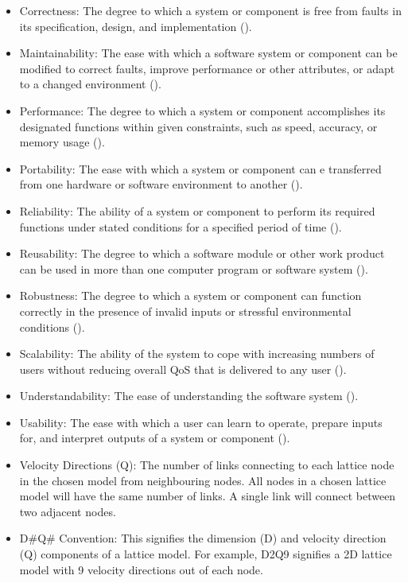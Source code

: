 \documentclass[12pt]{article}
\begin{document}
\begin{itemize}

\item Correctness: The degree to which a system or component is free from faults in its specification, design, and implementation (\citet{IEEEStdGlossarySET1990}).
\item Maintainability: The ease with which a software system or component can be modified to correct faults, improve performance or other attributes, or adapt to a changed environment (\citet{IEEEStdGlossarySET1990}).
\item Performance: The degree to which a system or component accomplishes its designated functions within given constraints, such as speed, accuracy, or memory usage (\citet{IEEEStdGlossarySET1990}).
\item Portability: The ease with which a system or component can e transferred from one hardware or software environment to another (\citet{IEEEStdGlossarySET1990}).
\item Reliability: The ability of a system or component to perform its required functions under stated conditions for a specified period of time (\citet{IEEEStdGlossarySET1990}).
\item Reusability: The degree to which a software module or other work product can be used in more than one computer program or software system (\citet{IEEEStdGlossarySET1990}).
\item Robustness: The degree to which a system or component can function correctly in the presence of invalid inputs or stressful environmental conditions (\citet{IEEEStdGlossarySET1990}).
\item Scalability: The ability of the system to cope with increasing numbers of users without reducing overall QoS that is delivered to any user (\citet{sommerville}).
\item Understandability: The ease of understanding the software system  (\citet{uchida2005experiment}).
\item Usability: The ease with which a user can learn to operate, prepare inputs for, and interpret outputs of a system or component (\citet{IEEEStdGlossarySET1990}).
\item Velocity Directions (Q): The number of links connecting to each lattice node in the chosen model from neighbouring nodes. All nodes in a chosen lattice model will have the same number of links. A single link will connect between two adjacent nodes.
\item D\#Q\# Convention: This signifies the dimension (D) and velocity direction (Q) components of a lattice model. For example, D2Q9 signifies a 2D lattice model with 9 velocity directions out of each node.

\end{itemize}
\end{document}
